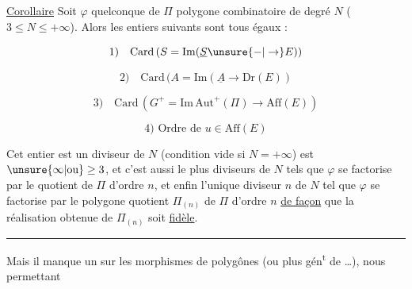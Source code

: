 \uline{Corollaire} Soit $\varphi$  quelconque de 
$\Pi$ polygone combinatoire de degré $N$
($3\leq N\leq+\infty$).  Alors les entiers suivants
sont tous égaux :

\[
\text{1)}\quad\mathrm{Card}\,(S=\mathrm{Im}(\underline S\unsure{-|\to}E))
\]

\[
\text{2)}\quad\mathrm{Card}\,(A=\mathrm{Im}(\underline A\to\mathrm{Dr}(E))
\]

\[
\text{3)}\quad\mathrm{Card}\,(G^+=\mathrm{Im}\,\mathrm{Aut}^{+}(\Pi)\to\mathrm{Aff}(E))
\]

\[
\text{4) Ordre de }u\in\mathrm{Aff}(E)
\]

 Cet entier  est  un diviseur de $N$
(condition vide si $N=+\infty$) est $\unsure{\infty|\text{ou}}\geq3$, et c'est
aussi le plus   diviseurs  de $N$ tels
que $\varphi$ se factorise par le  quotient
 de $\Pi$ d'ordre $n$, et enfin l'unique
diviseur $n$ de $N$ tel que $\varphi$ se factorise
par le polygone quotient $\Pi_{(n)}$ de $\Pi$
d'ordre $n$ \uline{de façon} que la réalisation
obtenue de $\Pi_{(n)}$ soit \uline{fidèle}.

\begin{center}\rule{1.6cm}{0.35pt}\end{center}

Mais il manque un  sur les
morphismes  de polygônes  (ou plus
gén\textsuperscript{t} de  \ldots), nous permettant
